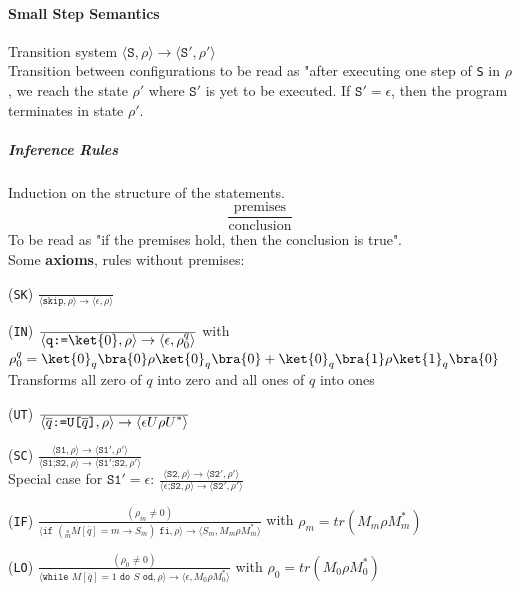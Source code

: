 \documentclass[10pt]{report}
\begin{document}
\paragraph{Small Step Semantics} Transition system $\langle \texttt{S}, \rho\rangle\rightarrow\langle\texttt{S}',\rho'\rangle$\\
Transition between configurations to be read as "after executing one step of \texttt{S} in $\rho$, we reach the state $\rho'$ where $\texttt{S}'$ is yet to be executed. If $\texttt{S}'=\epsilon$, then the program terminates in state $\rho'$.
\subparagraph{Inference Rules} Induction on the structure of the statements.
$$\frac{\text{premises}}{\text{conclusion}}$$
To be read as "if the premises hold, then the conclusion is true".\\
Some \textbf{axioms}, rules without premises:
\begin{list}{}{}
	\item[(\texttt{SK})] $\frac{\displaystyle\text{}}{\displaystyle\langle\texttt{skip},\rho\rangle\rightarrow\langle\epsilon,\rho\rangle}$
	\item[(\texttt{IN})] $\frac{\displaystyle\text{}}{\displaystyle\langle\texttt{q:=}\ket{0},\rho\rangle\rightarrow\langle\epsilon,\rho_0^q\rangle}$ with $\rho_0^q = \ket{0}_q\bra{0}\rho\ket{0}_q\bra{0} + \ket{0}_q\bra{1}\rho\ket{1}_q\bra{0}$\\Transforms all zero of $q$ into zero and all ones of $q$ into ones
	\item[(\texttt{UT})] $\frac{\displaystyle}{\displaystyle\langle \overline{q}\texttt{:=U[}\overline{q}\texttt{]},\rho\rangle\rightarrow\langle\epsilon U\rho U^*\rangle}$
	\item[(\texttt{SC})] $\frac{\displaystyle\langle \texttt{S1},\rho\rangle\rightarrow\langle \texttt{S1}',\rho'\rangle}{\displaystyle\langle\texttt{S1;S2},\rho\rangle\rightarrow\langle\texttt{S1}'\texttt{;S2},\rho'\rangle}$\\
	Special case for $\texttt{S1}' = \epsilon$: $\frac{\displaystyle\langle \texttt{S2},\rho\rangle\rightarrow\langle \texttt{S2}',\rho'\rangle}{\displaystyle\langle\epsilon\texttt{;S2},\rho\rangle\rightarrow\langle\texttt{S2}',\rho'\rangle}$
	\item[(\texttt{IF})] $\frac{\displaystyle(\rho_m\neq0)}{\displaystyle\langle\texttt{if }(\underset{m}{\square}M[\overline{q}]=m\rightarrow S_m)\texttt{ fi}, \rho\rangle\rightarrow\langle S_m,M_m\rho M_m^*\rangle}$ with $\rho_m = tr(M_m\rho M_m^*)$
	\item[(\texttt{LO})] $\frac{\displaystyle(\rho_0\neq 0)}{\displaystyle\langle\texttt{while }M[\overline{q}]=1\texttt{ do }S\texttt{ od},\rho\rangle\rightarrow\langle\epsilon,M_0\rho M_0^*\rangle}$ with $\rho_0 = tr(M_0\rho M_0^*)$

\end{list}
\end{document}
